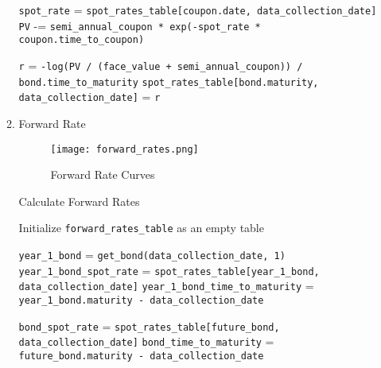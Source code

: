 \documentclass{article}
\begin{document}
\begin{enumerate}
\begin{enumerate}
\begin{algorithm}[H]
\begin{algorithmic}[1]
                            \State \texttt{spot\_rate} = \texttt{spot\_rates\_table[coupon.date, data\_collection\_date]}
                            \State \texttt{PV} -= \texttt{semi\_annual\_coupon * exp(-spot\_rate * coupon.time\_to\_coupon)}
                            \EndFor
                            \EndIf

                            \State \texttt{r} = \texttt{-log(PV / (face\_value + semi\_annual\_coupon)) / bond.time\_to\_maturity}
                            \State \texttt{spot\_rates\_table[bond.maturity, data\_collection\_date]} = \texttt{r}
                            \EndFor
                            \EndFor
                        \end{algorithmic}
                    \end{algorithm}
              \item Forward Rate
                    \begin{figure}[H]
                        \centering
                        \texttt{[image: forward\_rates.png]}
                        \caption{Forward Rate Curves}
                    \end{figure}
                    \begin{algorithm}[H]
                        \caption{Calculate Forward Rates}
                        \begin{algorithmic}[1]
                            \State Initialize \texttt{forward\_rates\_table} as an empty table

                            \State \texttt{year\_1\_bond} = \texttt{get\_bond(data\_collection\_date, 1)}
                            \State \texttt{year\_1\_bond\_spot\_rate} = \texttt{spot\_rates\_table[year\_1\_bond, data\_collection\_date]}
                            \State \texttt{year\_1\_bond\_time\_to\_maturity} = \texttt{year\_1\_bond.maturity - data\_collection\_date}

                            \State \texttt{bond\_spot\_rate} = \texttt{spot\_rates\_table[future\_bond, data\_collection\_date]}
                            \State \texttt{bond\_time\_to\_maturity} = \texttt{future\_bond.maturity - data\_collection\_date}


\end{algorithmic}
\end{algorithm}
\end{enumerate}
\end{enumerate}
\end{document}
